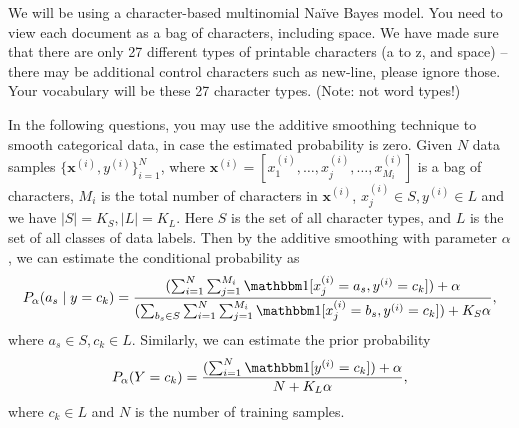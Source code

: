 \documentclass[a4paper]{article}
\theoremstyle{definition}
\newcommand{\vc}[1]{\boldsymbol{#1}}
\def\ind{\mathbbm 1}
\begin{document}
We will be using a character-based multinomial Naïve Bayes model. You need to view each document as a bag of characters, including space. We have made sure that there are only 27 different types of printable characters (a to z, and space) -- there may be additional control characters such as new-line, please ignore those. Your vocabulary will be these 27 character types. (Note: not word types!)

In the following questions, you may use the additive smoothing technique to smooth categorical data, in case the estimated probability is zero. Given $N$ data samples $\{\vc{x}^{(i)}, y^{(i)}\}_{i = 1}^{N}$, where $\vc{x}^{(i)} = [x_1^{(i)}, \dots, x_j^{(i)}, \dots, x_{M_i}^{(i)}]$ is a bag of characters, $M_i$ is the total number of characters in $\vc{x}^{(i)}$, $x_{j}^{(i)} \in S, y^{(i)} \in L$ and we have $|S| = K_S, |L| = K_L$. Here $S$ is the set of all character types, and $L$ is the set of all classes of data labels. Then by the additive smoothing with parameter $\alpha$, we can estimate the conditional probability as 
$$
P_{\alpha}(a_s \mid y = c_k) = \frac{(\sum_{i = 1}^{N}\sum_{j = 1}^{M_i}\ind [x_{j}^{(i)} = a_s, y^{(i)} = c_k]) + \alpha}{(\sum_{b_s \in S}\sum_{i = 1}^{N}\sum_{j = 1}^{M_i}\ind [x_{j}^{(i)} = b_s, y^{(i)} = c_k]) + K_S \alpha},
$$
where $a_s \in S, c_k \in L$. Similarly, we can estimate the prior probability
$$
P_{\alpha}(Y = c_k) = \frac{(\sum_{i = 1}^{N}\ind [y^{(i)} = c_k]) + \alpha}{N + K_L \alpha},
$$
where $c_k \in L$ and $N$ is the number of training samples.
\end{document}
